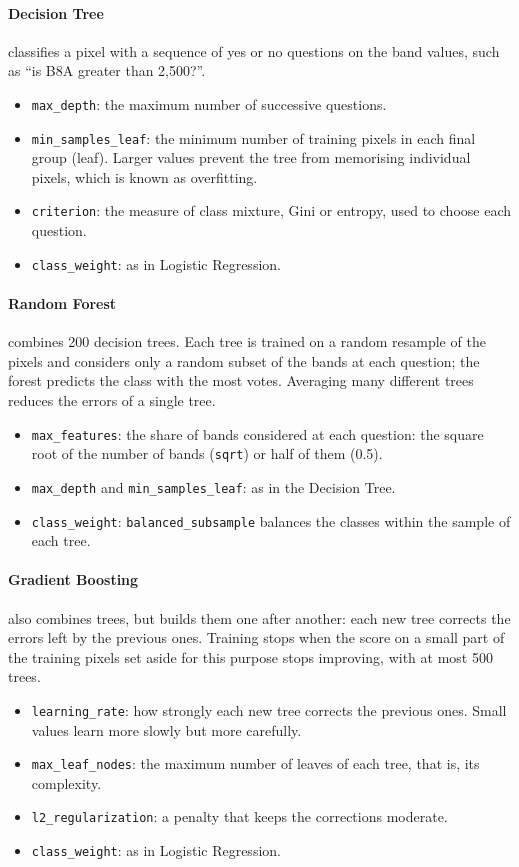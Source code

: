 \documentclass[11pt,a4paper]{article}
\begin{document}
\paragraph{Decision Tree} classifies a pixel with a sequence of yes or no
questions on the band values, such as ``is B8A greater than 2,500?''.
\begin{itemize}
  \item \texttt{max\_depth}: the maximum number of successive questions.
  \item \texttt{min\_samples\_leaf}: the minimum number of training pixels in
  each final group (leaf). Larger values prevent the tree from memorising
  individual pixels, which is known as overfitting.
  \item \texttt{criterion}: the measure of class mixture, Gini or entropy,
  used to choose each question.
  \item \texttt{class\_weight}: as in Logistic Regression.
\end{itemize}

\paragraph{Random Forest} combines 200 decision trees. Each tree is trained on
a random resample of the pixels and considers only a random subset of the
bands at each question; the forest predicts the class with the most votes.
Averaging many different trees reduces the errors of a single tree.
\begin{itemize}
  \item \texttt{max\_features}: the share of bands considered at each
  question: the square root of the number of bands (\texttt{sqrt}) or half
  of them (0.5).
  \item \texttt{max\_depth} and \texttt{min\_samples\_leaf}: as in the
  Decision Tree.
  \item \texttt{class\_weight}: \texttt{balanced\_subsample} balances the
  classes within the sample of each tree.
\end{itemize}

\paragraph{Gradient Boosting} also combines trees, but builds them one after
another: each new tree corrects the errors left by the previous ones. Training
stops when the score on a small part of the training pixels set aside for
this purpose stops improving, with at most 500 trees.
\begin{itemize}
  \item \texttt{learning\_rate}: how strongly each new tree corrects the
  previous ones. Small values learn more slowly but more carefully.
  \item \texttt{max\_leaf\_nodes}: the maximum number of leaves of each tree,
  that is, its complexity.
  \item \texttt{l2\_regularization}: a penalty that keeps the corrections
  moderate.
  \item \texttt{class\_weight}: as in Logistic Regression.
\end{itemize}
\end{document}
